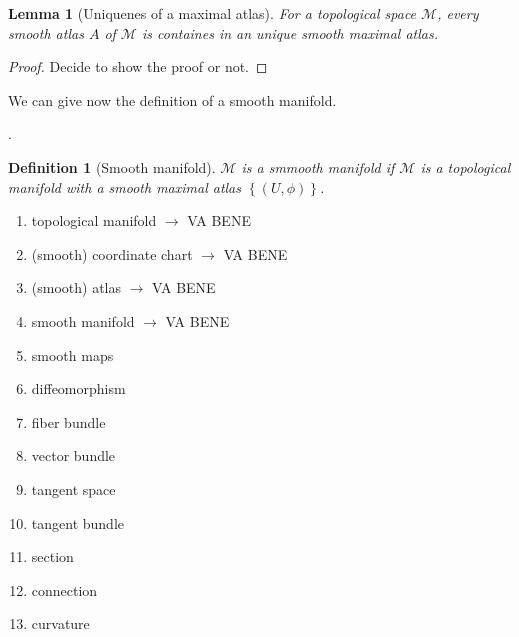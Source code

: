 \documentclass[10pt]{book}
\newcommand{\Mcal}{\mathcal{M}}
\newcommand{\Ncal}{\mathcal{N}}
\theoremstyle{break}
\newtheorem{lemma}{Lemma}
\newtheorem{definition}{Definition}
\newtheorem{proof}{Proof}
\begin{document}
\bigskip
{}
\bigskip

\begin{lemma}[Uniquenes of a maximal atlas]
For a topological space $\Mcal$, every smooth atlas $A$ of $\Mcal$ is containes in an unique smooth maximal atlas.
\end{lemma}

\begin{proof}
Decide to show the proof or not.
\end{proof}

We can give now the definition of a smooth manifold.

.\begin{definition}[Smooth manifold]
$\Mcal$ is a smmooth manifold if $\Mcal$ is a topological manifold with a smooth maximal atlas $\left\{(U,\phi)\right\}$.
\end{definition}


\begin{enumerate}
\setlength{\itemsep}{-4pt}
\item topological manifold $\to$ VA BENE
\item (smooth) coordinate chart $\to$ VA BENE
\item (smooth) atlas $\to$ VA BENE
\item smooth manifold $\to$ VA BENE
\item smooth maps
\item diffeomorphism
\item fiber bundle
\item vector bundle
\item tangent space
\item tangent bundle
\item section
\item connection
\item curvature
\end{enumerate}
\end{document}
